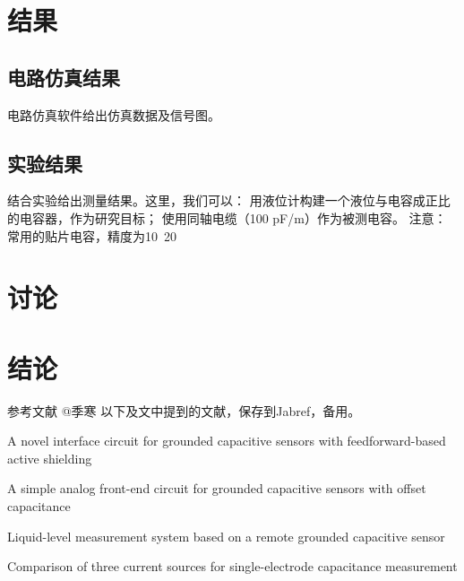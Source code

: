 \section{结果}
\subsection{电路仿真结果}
电路仿真软件给出仿真数据及信号图。

\subsection{实验结果}
结合实验给出测量结果。这里，我们可以：
用液位计构建一个液位与电容成正比的电容器，作为研究目标；
使用同轴电缆（100 pF/m）作为被测电容。
注意：常用的贴片电容，精度为10~20%



\section{讨论}

\section{结论}







参考文献
﻿﻿@季寒﻿﻿ 以下及文中提到的文献，保存到Jabref，备用。

A novel interface circuit for grounded capacitive sensors with feedforward-based active shielding

A simple analog front-end circuit for grounded capacitive sensors with offset capacitance

Liquid-level measurement system based on a remote grounded capacitive sensor

Comparison of three current sources for single-electrode capacitance measurement

